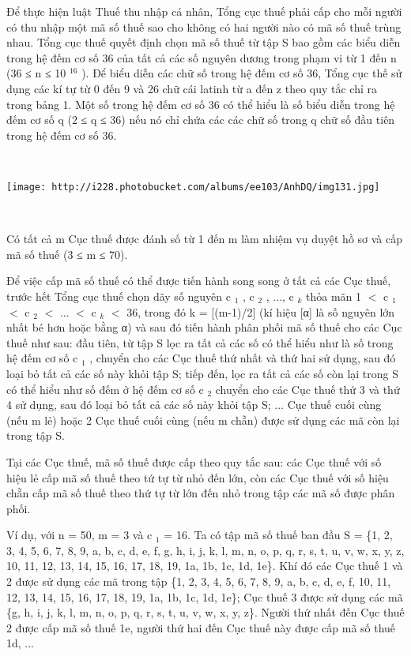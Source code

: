 

Để thực hiện luật Thuế thu nhập cá nhân, Tổng cục thuế phải cấp cho mỗi người có thu nhập một mã số thuế sao cho không có hai người nào có mã số thuế trùng nhau. Tổng cục thuế quyết định chọn mã số thuế từ tập S bao gồm các biểu diễn trong hệ đếm cơ số 36 của tất cả các số nguyên dương trong phạm vi từ 1 đến n (36 ≤ n ≤ 10 $^ 16 $ ). Để biểu diễn các chữ số trong hệ đếm cơ số 36, Tổng cục thế sử dụng các kí tự từ 0 đến 9 và 26 chữ cái latinh từ a đến z theo quy tắc chỉ ra trong bảng 1. Một số trong hệ đếm cơ số 36 có thể hiểu là số biểu diễn trong hệ đếm cơ số q (2 ≤ q ≤ 36) nếu nó chỉ chứa các các chữ số trong q chữ số đầu tiên trong hệ đếm cơ số 36.

 


\texttt{[image: http://i228.photobucket.com/albums/ee103/AnhDQ/img131.jpg]}

 

Có tất cả m Cục thuế được đánh số từ 1 đến m làm nhiệm vụ duyệt hồ sơ và cấp mã số thuế (3 ≤ m ≤ 70).

Để việc cấp mã số thuế có thể được tiến hành song song ở tất cả các Cục thuế, trước hết Tổng cục thuế chọn dãy số nguyên c $_ 1 $ , c $_ 2 $ , ..., c $_ k $ thỏa mãn 1 $<$ c $_ 1 $ $<$ c $_ 2 $ $<$ ... $<$ c $_ k $ $<$ 36, trong đó k = [(m-1)/2] (kí hiệu [α] là số nguyên lớn nhất bé hơn hoặc bằng α) và sau đó tiến hành phân phối mã số thuế cho các Cục thuế như sau: đầu tiên, từ tập S lọc ra tất cả các số có thể hiểu như là số trong hệ đếm cơ số c $_ 1 $ , chuyển cho các Cục thuế thứ nhất và thứ hai sử dụng, sau đó loại bỏ tất cả các số này khỏi tập S; tiếp đến, lọc ra tất cả các số còn lại trong S có thể hiểu như số đếm ở hệ đếm cơ số c $_ 2 $ chuyển cho các Cục thuế thứ 3 và thứ 4 sử dụng, sau đó loại bỏ tất cả các số này khỏi tập S; ... Cục thuế cuối cùng (nếu m lẻ) hoặc 2 Cục thuế cuối cùng (nếu m chẵn) được sử dụng các mã còn lại trong tập S.

Tại các Cục thuế, mã số thuế được cấp theo quy tắc sau: các Cục thuế với số hiệu lẻ cấp mã số thuế theo tứ tự từ nhỏ đến lớn, còn các Cục thuế với số hiệu chẵn cấp mã số thuế theo thứ tự từ lớn đến nhỏ trong tập các mã số được phân phối.

Ví dụ, với n = 50, m = 3 và c $_ 1 $ = 16. Ta có tập mã số thuế ban đầu S = \{1, 2, 3, 4, 5, 6, 7, 8, 9, a, b, c, d, e, f, g, h, i, j, k, l, m, n, o, p, q, r, s, t, u, v, w, x, y, z, 10, 11, 12, 13, 14, 15, 16, 17, 18, 19, 1a, 1b, 1c, 1d, 1e\}. Khí đó các Cục thuế 1 và 2 được sử dụng các mã trong tập \{1, 2, 3, 4, 5, 6, 7, 8, 9, a, b, c, d, e, f, 10, 11, 12, 13, 14, 15, 16, 17, 18, 19, 1a, 1b, 1c, 1d, 1e\}; Cục thuế 3 được sử dụng các mã \{g, h, i, j, k, l, m, n, o, p, q, r, s, t, u, v, w, x, y, z\}. Người thứ nhất đến Cục thuế 2 được cấp mã số thuế 1e, người thứ hai đến Cục thuế này được cấp mã số thuế 1d, ...

